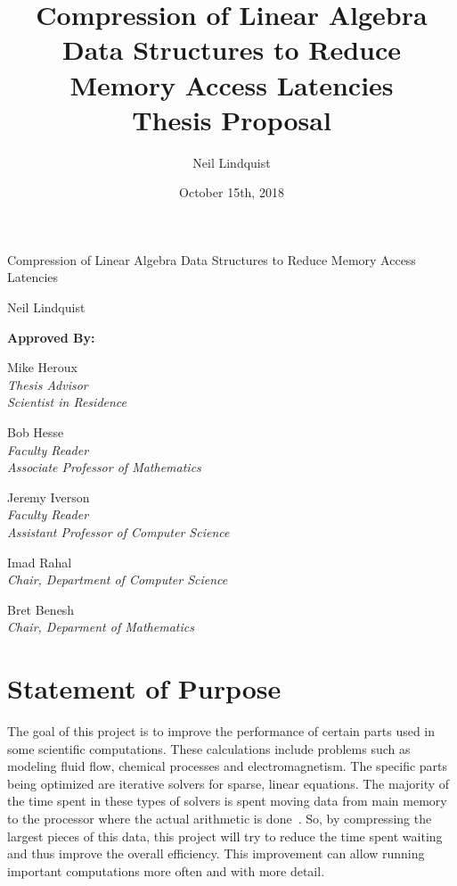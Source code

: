 \documentclass[titlepage]{article}
\begin{document}
\title{
	Compression of Linear Algebra Data Structures to Reduce Memory Access Latencies \\
	\bigskip
	\Large Thesis Proposal}
\author{Neil Lindquist}
\date{October 15th, 2018}

\maketitle

\begin{center}
	{\Large Compression of Linear Algebra Data Structures to Reduce Memory Access Latencies}
	
	Neil Lindquist
	
	\bigskip
	\bigskip
	
	\textbf{Approved By:}
	
	\bigskip
	
	Mike Heroux\\
	\textit{Thesis Advisor}\\
	\textit{Scientist in Residence}

	\bigskip

	Bob Hesse\\
	\textit{Faculty Reader}\\
	\textit{Associate Professor of Mathematics}

	\bigskip

	Jeremy Iverson\\
	\textit{Faculty Reader}\\
	\textit{Assistant Professor of Computer Science}
	
	\bigskip
	
	Imad Rahal\\
	\textit{Chair, Department of Computer Science}
	
	\bigskip
	
	Bret Benesh\\
	\textit{Chair, Deparment of Mathematics}
\end{center}

\clearpage


\section{Statement of Purpose}
The goal of this project is to improve the performance of certain parts
used in some scientific computations.
These calculations include problems such as modeling fluid flow, chemical processes and electromagnetism.
The specific parts being optimized are iterative solvers for sparse, linear equations.
The majority of the time spent in these types of solvers is spent moving data from main memory
to the processor where the actual arithmetic is done~\cite{Lawlor:2013:compression}.
So, by compressing the largest pieces of this data, this project will try to reduce the time spent waiting and thus improve the overall efficiency.
This improvement can allow running important computations more often and with more detail.
\end{document}
